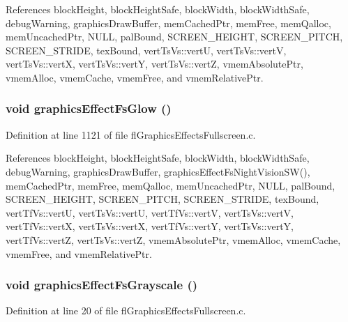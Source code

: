 References block\-Height, block\-Height\-Safe, block\-Width, block\-Width\-Safe, debug\-Warning, graphics\-Draw\-Buffer, mem\-Cached\-Ptr, mem\-Free, mem\-Qalloc, mem\-Uncached\-Ptr, NULL, pal\-Bound, SCREEN\_\-HEIGHT, SCREEN\_\-PITCH, SCREEN\_\-STRIDE, tex\-Bound, vert\-Ts\-Vs::vert\-U, vert\-Ts\-Vs::vert\-V, vert\-Ts\-Vs::vert\-X, vert\-Ts\-Vs::vert\-Y, vert\-Ts\-Vs::vert\-Z, vmem\-Absolute\-Ptr, vmem\-Alloc, vmem\-Cache, vmem\-Free, and vmem\-Relative\-Ptr.
\subsubsection{\setlength{\rightskip}{0pt plus 5cm}void graphics\-Effect\-Fs\-Glow ()}\label{flGraphicsEffectsFullscreen_8h_d46c5e3e0ab2edd95dc6a95b8e90a249}




Definition at line 1121 of file fl\-Graphics\-Effects\-Fullscreen.c.

References block\-Height, block\-Height\-Safe, block\-Width, block\-Width\-Safe, debug\-Warning, graphics\-Draw\-Buffer, graphics\-Effect\-Fs\-Night\-Vision\-SW(), mem\-Cached\-Ptr, mem\-Free, mem\-Qalloc, mem\-Uncached\-Ptr, NULL, pal\-Bound, SCREEN\_\-HEIGHT, SCREEN\_\-PITCH, SCREEN\_\-STRIDE, tex\-Bound, vert\-Tf\-Vs::vert\-U, vert\-Ts\-Vs::vert\-U, vert\-Tf\-Vs::vert\-V, vert\-Ts\-Vs::vert\-V, vert\-Tf\-Vs::vert\-X, vert\-Ts\-Vs::vert\-X, vert\-Tf\-Vs::vert\-Y, vert\-Ts\-Vs::vert\-Y, vert\-Tf\-Vs::vert\-Z, vert\-Ts\-Vs::vert\-Z, vmem\-Absolute\-Ptr, vmem\-Alloc, vmem\-Cache, vmem\-Free, and vmem\-Relative\-Ptr.
\subsubsection{\setlength{\rightskip}{0pt plus 5cm}void graphics\-Effect\-Fs\-Grayscale ()}\label{flGraphicsEffectsFullscreen_8h_f54c150ec57fe3f301804e0ce752d064}




Definition at line 20 of file fl\-Graphics\-Effects\-Fullscreen.c.

